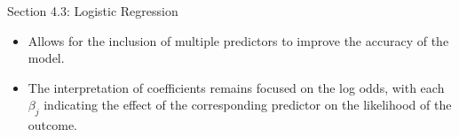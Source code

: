 \begin{notes}{Section 4.3: Logistic Regression}
    \begin{highlight}
        \begin{itemize}
            \item Allows for the inclusion of multiple predictors to improve the accuracy of the model.
            \item The interpretation of coefficients remains focused on the log odds, with each $\beta_j$ indicating the effect of the corresponding predictor on the likelihood of the outcome.
        \end{itemize}
    \end{highlight}
\end{notes}
